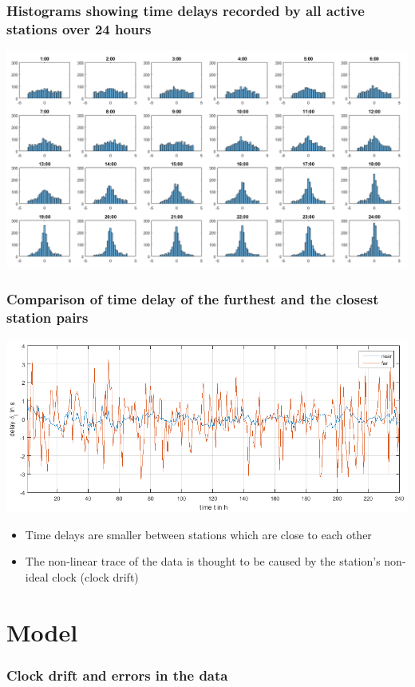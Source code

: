 \documentclass{beamer}
\begin{document}
\begin{frame}
\frametitle{Histograms showing time delays recorded by all active stations over 24 hours}
\includegraphics[width=\textwidth]{hourlydelaydistributionoverallstationsforoneday.png}
\end{frame}

\begin{frame}
\frametitle{Comparison of time delay of the furthest and the closest station pairs}
\includegraphics[width=\textwidth]{Comparisondelayoverrandomdayoffarestandclosestlinks.png}

\begin{itemize}
\item Time delays are smaller between stations which are close to each other
\item The non-linear trace of the data is thought to be caused by the station's non-ideal clock (clock drift)
\end{itemize}
\end{frame}

\section{Model}

\begin{frame}
\frametitle{Clock drift and errors in the data}

\end{frame}
\end{document}
